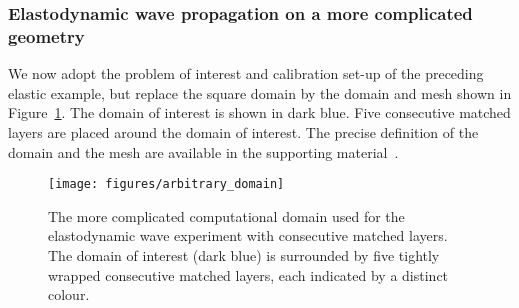 \documentclass[a4paper]{article}
\begin{document}
\subsubsection{Elastodynamic wave propagation on a more complicated
geometry}
\label{sec:arbitrary}

We now adopt the problem of interest and calibration set-up of the preceding
elastic example, but replace the square domain by the domain and mesh shown in
Figure~\ref{fig:arbitrary_domain}.  The domain of interest is shown in
dark blue. Five consecutive matched layers are placed around the
domain of interest. The precise definition of the domain and the mesh
are available in the supporting material~\citep{pmlcode}.
\begin{figure}
  \centering
  \texttt{[image: figures/arbitrary\_domain]}
  \caption{The more complicated computational domain used for the
    elastodynamic wave experiment with consecutive matched layers. The
    domain of interest (dark blue) is surrounded by five tightly
    wrapped consecutive matched layers, each indicated by a distinct
    colour.}
  \label{fig:arbitrary_domain}
\end{figure}
\end{document}
